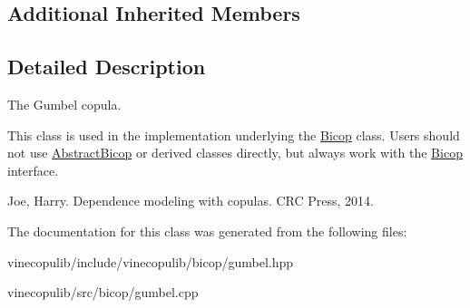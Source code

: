 \subsection*{Additional Inherited Members}


\subsection{Detailed Description}
The Gumbel copula. 

This class is used in the implementation underlying the \hyperlink{classvinecopulib_1_1_bicop}{Bicop} class. Users should not use \hyperlink{classvinecopulib_1_1_abstract_bicop}{Abstract\+Bicop} or derived classes directly, but always work with the \hyperlink{classvinecopulib_1_1_bicop}{Bicop} interface.

Joe, Harry. Dependence modeling with copulas. C\+R\+C Press, 2014. 

The documentation for this class was generated from the following files\+:\begin{DoxyCompactItemize}
\item 
vinecopulib/include/vinecopulib/bicop/gumbel.\+hpp\item 
vinecopulib/src/bicop/gumbel.\+cpp\end{DoxyCompactItemize}
